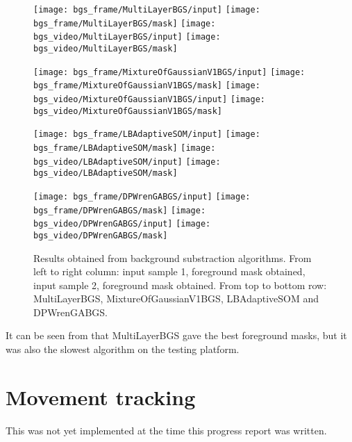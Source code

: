 \begin{figure}[H]
  \centering
  \texttt{[image: bgs\_frame/MultiLayerBGS/input]}
  \texttt{[image: bgs\_frame/MultiLayerBGS/mask]}
  \texttt{[image: bgs\_video/MultiLayerBGS/input]}
  \texttt{[image: bgs\_video/MultiLayerBGS/mask]}

  \texttt{[image: bgs\_frame/MixtureOfGaussianV1BGS/input]}
  \texttt{[image: bgs\_frame/MixtureOfGaussianV1BGS/mask]}
  \texttt{[image: bgs\_video/MixtureOfGaussianV1BGS/input]}
  \texttt{[image: bgs\_video/MixtureOfGaussianV1BGS/mask]}

  \texttt{[image: bgs\_frame/LBAdaptiveSOM/input]}
  \texttt{[image: bgs\_frame/LBAdaptiveSOM/mask]}
  \texttt{[image: bgs\_video/LBAdaptiveSOM/input]}
  \texttt{[image: bgs\_video/LBAdaptiveSOM/mask]}

  \texttt{[image: bgs\_frame/DPWrenGABGS/input]}
  \texttt{[image: bgs\_frame/DPWrenGABGS/mask]}
  \texttt{[image: bgs\_video/DPWrenGABGS/input]}
  \texttt{[image: bgs\_video/DPWrenGABGS/mask]}
  \caption{Results obtained from background substraction algorithms. From left to right column: input sample 1, foreground mask obtained, input sample 2, foreground mask obtained. From top to bottom row: MultiLayerBGS, MixtureOfGaussianV1BGS, LBAdaptiveSOM and DPWrenGABGS.}
  \label{Figure:bgs_frame}
\end{figure}

It can be seen from  that MultiLayerBGS gave the best foreground masks, but it was also the slowest algorithm on the testing platform.

\section{Movement tracking}

This was not yet implemented at the time this progress report was written.
